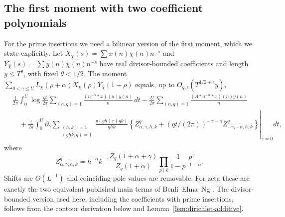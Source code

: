 \subsection{The first moment with two coefficient polynomials}
For the prime insertions we need a bilinear version of the first
moment, which we state explicitly. Let
$X_\chi(s)=\sum x(n)\chi(n)n^{-s}$ and
$Y_{\bar\chi}(s)=\sum y(n)\bar\chi(n)n^{-s}$ have real divisor-bounded
coefficients and length $y\le T^\theta$, with fixed $\theta<1/2$.
The moment $\sum_{0<\gamma\le U}L_\chi(\rho+\alpha)
X_\chi(\rho)Y_{\bar\chi}(1-\rho)$ equals, up to
$O_{q,\epsilon}(T^{1/2+\epsilon}y)$,
\begin{align}\label{eq:bilinear-first-shift}
 &\frac1{2\pi}\int_0^U\log\frac{qt}{2\pi}
       \sum_{(n,q)=1}\frac{(n^{-\alpha}*x)(n)y(n)}n\,dt
 -\frac U{2\pi}\sum_{(n,q)=1}
       \frac{(\Lambda*n^{-\alpha}*x)(n)y(n)}n\nonumber\\
 &\quad+\frac1{2\pi}\int_0^U\left.\partial_\gamma
       \sum_{\substack{(h,k)=1\\(ghk,q)=1}}
       \frac{y(gh)x(gk)}{ghk}
       \left\{Z^q_{\alpha,\gamma,h,k}
       +(qt/(2\pi))^{-\alpha-\gamma}
                    Z^q_{-\gamma,-\alpha,h,k}\right\}
                              \right|_{\gamma=0}dt,
\end{align}
where
\[
 Z^q_{\alpha,\gamma,h,k}
 =h^{-\alpha}k^{-\gamma}
   \frac{Z_q(1+\alpha+\gamma)}{Z_q(1+\alpha)}
        \prod_{p\mid k}\frac{1-p^\gamma}{1-p^{-1-\alpha}}.
\]
Shifts are $O(L^{-1})$ and coinciding-pole values are removable.
For zeta these are exactly the two equivalent published main terms
of Benli--Elma--Ng \cite[Theorem~1.1, equations~(9)--(14),
pp.~3--4]{benli-elma-ng}. The divisor-bounded version used here,
including the coefficients with prime insertions, follows from the
contour derivation below and Lemma~\ref{lem:dirichlet-additive}.

